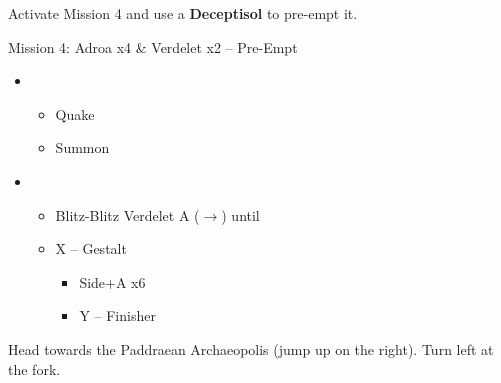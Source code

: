 Activate Mission 4 and use a \textbf{Deceptisol} to pre-empt it.

\begin{battle}{Mission 4: Adroa x4 \& Verdelet x2 -- Pre-Empt}
	\begin{itemize}
		\item \third
			\begin{itemize}
				\item Quake
				\item Summon
			\end{itemize}
		\item \fifth
			\begin{itemize}
				\item Blitz-Blitz Verdelet A ($\rightarrow$) until \stagger
				\item X -- Gestalt
					\begin{itemize}
						\item Side+A x6
						\item Y -- Finisher
					\end{itemize}
			\end{itemize}
	\end{itemize}
\end{battle}

Head towards the Paddraean Archaeopolis (jump up on the right). Turn left at the fork.

